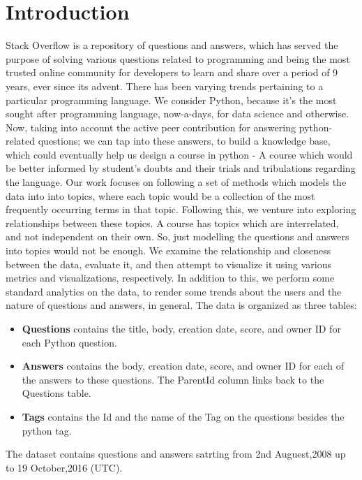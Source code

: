 \documentclass[journal]{IEEEtran}
\begin{document}
\section{Introduction}
Stack Overflow is a repository of questions and answers, which has served the purpose of solving various questions related to programming and being the most trusted online community for developers to learn and share over a period of 9 years, ever since its advent. There has been varying trends pertaining to a particular programming language. We consider Python, because it's the most sought after programming language, now-a-days, for data science and otherwise. Now, taking into account the active peer contribution for answering python-related questions; we can tap into these answers, to build a knowledge base, which could eventually help us design a course in python - A course which would be better informed by student's doubts and their trials and tribulations regarding the language. Our work focuses on following a set of methods which models the data into into topics, where each topic would be a collection of the most frequently occurring terms in that topic. Following this, we venture into exploring relationships between these topics. A course has topics which are interrelated, and not independent on their own. So, just modelling the questions and answers into topics would not be enough. We examine the relationship and closeness between the data, evaluate it, and then attempt to visualize it using various metrics and visualizations, respectively. In addition to this, we perform some standard analytics on the data, to render some trends about the users and the nature of questions and answers, in general.
The data is organized as three tables:
\begin{itemize}
    \item \textbf{Questions} contains the title, body, creation date, score, and owner ID for each Python question.
    \item \textbf{Answers} contains the body, creation date, score, and owner ID for each of the answers to these questions. The ParentId column links back to the Questions table.
    \item \textbf{Tags} contains the Id and the name of the Tag on the questions besides the python tag.
\end{itemize}
The dataset contains questions and answers satrting from 2nd Auguest,2008 up to 19 October,2016 (UTC).
\end{document}
